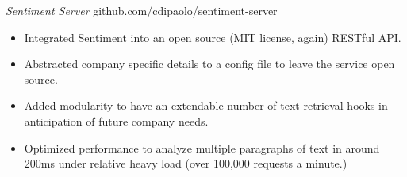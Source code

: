 \documentclass[margin, 10pt]{res} %
\begin{document}
\begin{resume}
{\sl Sentiment Server} \hfill github.com/cdipaolo/sentiment-server
\begin{itemize}
\item Integrated Sentiment into an open source (MIT license, again) RESTful API.
\item Abstracted company specific details to a config file to leave the service open source.
\item Added modularity to have an extendable number of text retrieval hooks in anticipation of future company needs.
\item Optimized performance to analyze multiple paragraphs of text in around 200ms under relative heavy load (over 100,000 requests a minute.)
\end{itemize}


\end{resume}
\end{document}
